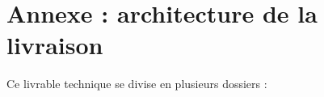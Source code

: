 \documentclass[a4paper,twoside,12pt]{article}
\begin{document}
\section{Annexe : architecture de la livraison}\label{annexe}

Ce livrable technique se divise en plusieurs dossiers :

\begin{comment} %
\begin{forest}
	for tree={
		font=\ttfamily,
		grow'=0,
		child anchor=west,
		parent anchor=south,
		anchor=west,
		calign=first,
		edge path={
			\noexpand\path [draw, \forestoption{edge}]
			(!u.south west) +(7.5pt,0) |- node[fill,inner sep=1.25pt] {} (.child anchor)\forestoption{edge label};
		},
		before typesetting nodes={
			if n=1
			{insert before={[,phantom]}}
			{}
		},
		fit=band,
		before computing xy={l=15pt},
	}
	[Jacquot
	[ead
	[ead.dtd (183kB)\hspace{5 mm}\# Document type definition EAD]
	[FRBAM-Americain.xml (275kB)\hspace{5 mm}\# Instrument de recherche EAD]
	[FRBAM-Angrand.xml (66Kb)\hspace{5 mm}\# Instrument de recherche EAD]
	[FRBAM-Mexicain.xml (716kB)\hspace{5 mm}\# Instrument de recherche EAD]
	]
	[edition
	[Mexicain65-71
	[documentation
	[out
	[ODD-Mexicain65-71.rng (408Kb)\hspace{5 mm}\# Fichier ODD RelaxNG]
	]
	[DTD-Entity.dtd (7Kb)\hspace{5 mm}\# Document type definition]
	[ODD-Mexicain65-71.html (2Mb)\hspace{5 mm}\# Version HTML de l'ODD]
	[ODD-Mexicain65-71.xml (109Kb)\hspace{5 mm}\# Version XML de l'ODD]
	]
	[visualisation
	[fol\_94r.jpg (223Kb)\hspace{5 mm}\# Fichier image]
	[fol\_95r.jpg (293Kb)\hspace{5 mm}\# Fichier image]
	[fol\_95v.jpg (218Kb)\hspace{5 mm}\# Fichier image]
	[fol\_96r.jpg (253Kb)\hspace{5 mm}\# Fichier image]
	[fol\_96v.jpg (273Kb)\hspace{5 mm}\# Fichier image]
	[fol\_97r.jpg (264Kb)\hspace{5 mm}\# Fichier image]
	[fol\_97v.jpg (205Kb)\hspace{5 mm}\# Fichier image]
	[fol\_98r.jpg (230Kb)\hspace{5 mm}\# Fichier image]

\end{comment}
\end{document}

